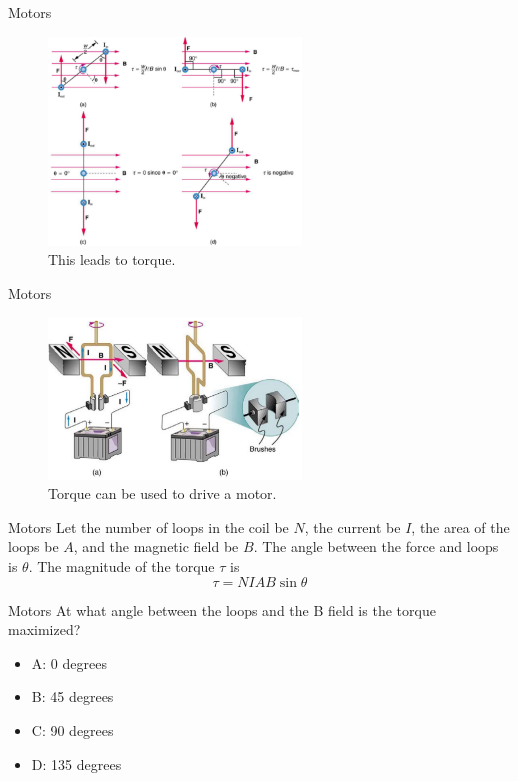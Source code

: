 \documentclass{beamer}
\begin{document}
\begin{frame}{Motors} 
\begin{figure}
\centering
\includegraphics[width=0.6\textwidth]{figures/torque.png}
\caption{\label{fig:loop2} This leads to torque.}
\end{figure}
\end{frame}

\begin{frame}{Motors} 
\begin{figure}
\centering
\includegraphics[width=0.6\textwidth]{figures/motor.png}
\caption{\label{fig:loop3} Torque can be used to drive a motor.}
\end{figure}
\end{frame}

\begin{frame}{Motors}
Let the number of loops in the coil be $N$, the current be $I$, the area of the loops be $A$, and the magnetic field be $B$.  The angle between the force and loops is $\theta$.  The magnitude of the torque $\tau$ is
\begin{equation}
\tau = N I A B \sin\theta
\end{equation}
\end{frame}

\begin{frame}{Motors}
At what angle between the loops and the B field is the torque maximized?
\begin{itemize}
\item A: 0 degrees
\item B: 45 degrees
\item C: 90 degrees
\item D: 135 degrees
\end{itemize}
\end{frame}
\end{document}
